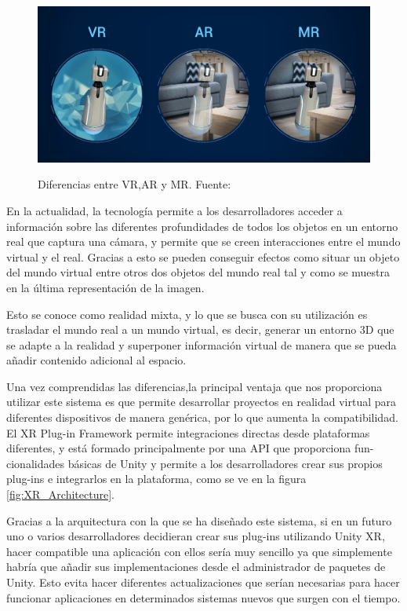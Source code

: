 \documentclass[../main.tex]{subfiles}
\begin{document}
\begin{figure}[h!]
\centering
\includegraphics[width=12cm, height=6cm]{imagenes/vr_ar_mr_diffs.jpg}
\caption{Diferencias entre VR,AR y MR. Fuente:\cite{Unity_XR_Introduction}}
\label{fig:XR_Introduction}
\end{figure}

En la actualidad, la tecnología permite a los desarrolladores acceder a información sobre las diferentes profundidades de todos los objetos en un entorno real que captura una cámara, y permite que se creen interacciones entre el mundo virtual y el real. Gracias a esto se pueden conseguir efectos como situar un objeto del mundo virtual entre otros dos objetos del mundo real tal y como se muestra en la última representación de la imagen.

Esto se conoce como realidad mixta, y lo que se busca con su utilización es trasladar el mundo real a un mundo virtual, es decir, generar un entorno 3D que se adapte a la realidad y superponer información virtual de manera que se pueda añadir contenido adicional al espacio.

Una vez comprendidas las diferencias,la principal ventaja que nos proporciona utilizar este sistema es que permite desarrollar proyectos en realidad virtual para diferentes dispositivos de manera genérica, por lo que aumenta la compatibilidad. El XR Plug-in Framework permite integraciones directas desde plataformas diferentes, y está formado principalmente por una API que proporciona fun- cionalidades básicas de Unity y permite a los desarrolladores crear sus propios plug-ins e integrarlos en la plataforma, como se ve en la figura \ref{fig:XR_Architecture}.

Gracias a la arquitectura con la que se ha diseñado este sistema, si en un futuro uno o varios desarrolladores decidieran crear sus plug-ins utilizando Unity XR, hacer compatible una aplicación con ellos sería muy sencillo ya que simplemente habría que añadir sus implementaciones desde el administrador de paquetes de Unity. Esto evita hacer diferentes actualizaciones que serían necesarias para hacer funcionar aplicaciones en determinados sistemas nuevos que surgen con el tiempo.
\end{document}
